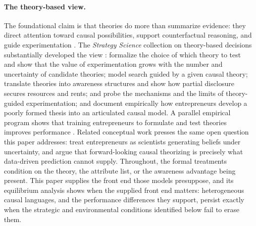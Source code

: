 \documentclass[11pt]{article}
\theoremstyle{definition}
\begin{document}
\paragraph{The theory-based view.}
The foundational claim is that theories do more than summarize evidence: they direct attention toward causal possibilities, support counterfactual reasoning, and guide experimentation \citep{FelinZenger2017}.
The \emph{Strategy Science} collection on theory-based decisions substantially developed the view \citep{FelinGambardellaZenger2024}: \citet{CamuffoEtAl2024} formalize the choice of which theory to test and show that the value of experimentation grows with the number and uncertainty of candidate theories; \citet{ChavdaGansStern2024} model search guided by a given causal theory; \citet{EhrigZenger2024} translate theories into awareness structures and show how partial disclosure secures resources and rents; \citet{Sorenson2024} and \citet{AdnerLevinthal2024} probe the mechanisms and the limits of theory-guided experimentation; and \citet{OttHannah2024} document empirically how entrepreneurs develop a poorly formed thesis into an articulated causal model.
A parallel empirical program shows that training entrepreneurs to formulate and test theories improves performance \citep{CamuffoEtAl2020}.
Related conceptual work presses the same open question this paper addresses: \citet{ZellwegerZenger2023} treat entrepreneurs as scientists generating beliefs under uncertainty, and \citet{FelinHolweg2024} argue that forward-looking causal theorizing is precisely what data-driven prediction cannot supply.
Throughout, the formal treatments condition on the theory, the attribute list, or the awareness advantage being present.
This paper supplies the front end those models presuppose, and its equilibrium analysis shows when the supplied front end matters: heterogeneous causal languages, and the performance differences they support, persist exactly when the strategic and environmental conditions identified below fail to erase them.
\end{document}
